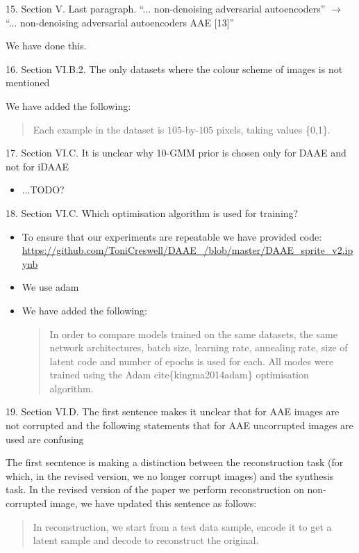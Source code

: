 \documentclass{article}
\begin{document}
{\color{blue}
15. Section V. Last paragraph. ``... non-denoising adversarial autoencoders'' $\rightarrow$ ``... non-denoising adversarial autoencoders AAE [13]''} \newline

We have done this.

{\color{blue}
16. Section VI.B.2. The only datasets where the colour scheme of images is not mentioned} \newline

We have added the following: 
\begin{quote}
     Each example in the dataset is $105$-by-$105$ pixels, taking values \{0,1\}. 
\end{quote}

{\color{blue}
17. Section VI.C. It is unclear why 10-GMM prior is chosen only for DAAE and not for iDAAE} \newline

\begin{itemize}
    \item ...TODO? 
\end{itemize}

{\color{blue}
18. Section VI.C. Which optimisation algorithm is used for training?}
\begin{itemize}
    \item To ensure that our experiments are repeatable we have provided code: \url{https://github.com/ToniCreswell/DAAE_/blob/master/DAAE_sprite_v2.ipynb}
    \item We use adam
    \item We have added the following:
    \begin{quote}
        In order to compare models trained on the same datasets, the same network architectures, batch size, learning rate, annealing rate, size of latent code and number of epochs is used for each. All modes were trained using the Adam cite\{kingma2014adam\} optimisation algorithm.
    \end{quote}
\end{itemize}

{\color{blue}
19. Section VI.D. The first sentence makes it unclear that for AAE images are not corrupted and the following statements that for AAE uncorrupted images are used are confusing
}

{\color{red}
The first secntence is making a distinction between the reconstruction task (for which, in the revised version, we no longer corrupt images) and the synthesis task. In the revised version of the paper we perform reconstruction on non-corrupted image, we have updated this sentence as follows:

\begin{quote}
In reconstruction, we start from a test data sample, encode it to get a latent sample and decode to reconstruct the original. 
\end{quote}
}
\end{document}
